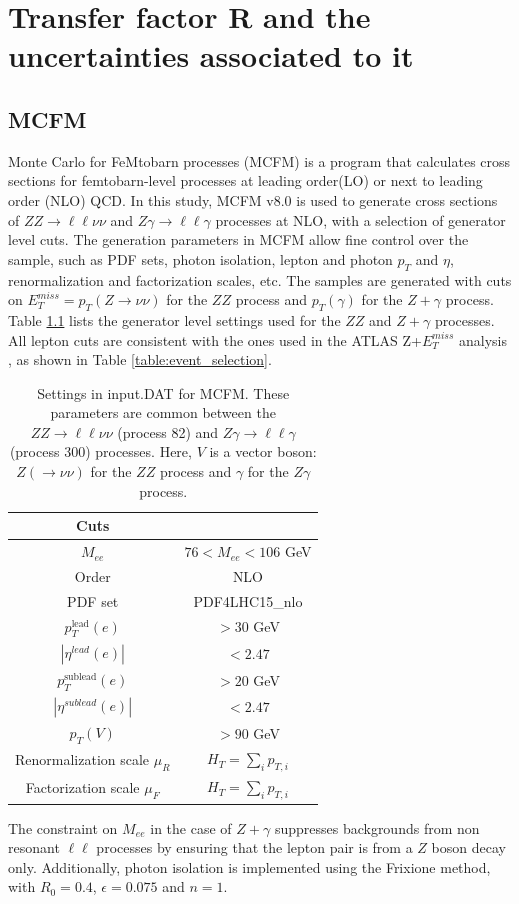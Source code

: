 \documentclass[12pt,a4paper,openright,twoside]{report}
\newcommand{\ZZ}{$ZZ\to \ell\ell\nu\nu$ }
\newcommand{\Zg}{$Z\gamma\to \ell\ell\gamma$ }
\begin{document}
\chapter{Transfer factor R and the uncertainties associated to it}\label{ch:Results}

\section{MCFM}\label{sec:MCFM}
Monte Carlo for FeMtobarn processes (MCFM) is a program that calculates cross sections for femtobarn-level processes at leading order(LO) or next to leading order (NLO) QCD. In this study, MCFM v8.0 \cite{MCFM1, MCFM2, MCFM3, MCFM} is used to generate cross sections of \ZZ and \Zg processes at NLO, with a selection of generator level cuts. The generation parameters in MCFM allow fine control over the sample, such as PDF sets, photon isolation, lepton and photon $p_T$ and $\eta$, renormalization and factorization scales, etc. The samples are generated with cuts on $E_T^{miss} = p_T(Z\to \nu\nu)$ for the $ZZ$ process and $p_T(\gamma)$ for the $Z+\gamma$ process. Table \ref{table:default} lists the generator level settings used for the $ZZ$ and $Z+\gamma$ processes. All lepton cuts are consistent with the ones used in the ATLAS Z+$E_T^{miss}$ analysis \cite{ZH_ATLAS}, as shown in Table \ref{table:event_selection}.

{\renewcommand{\arraystretch}{1.5}
\begin{table}[H]
\centering
	\begin{tabular}{c c}
	\hline
	\hline
	\textbf{Cuts} &\\
	\hline
	$M_{ee}$ & $76 < M_{ee} < 106$ GeV\\
	\hline
	Order & NLO \\
	\hline
	PDF set & PDF4LHC15\_nlo\\
	\hline
	$p_T^{\text{lead}}(e)$ & $> 30$ GeV \\
	\hline
	$|\eta^{lead}(e)|$ & $< 2.47$\\
	\hline
	$p_T^{\text{sublead}}(e)$ & $> 20$ GeV\\
	\hline
	$|\eta^{sublead}(e)|$ & $< 2.47$\\
	\hline
	$p_T(V)$\footnotemark & $> 90$ GeV\\
	\hline
	Renormalization scale $\mu_R$& $H_T = \sum_{i}p_{T,i}$\\
	\hline
	Factorization scale $\mu_F$& $H_T = \sum_{i}p_{T,i}$\\
	\hline
	\hline
	\end{tabular}
	\caption{Settings in input.DAT for MCFM. These parameters are common between the \ZZ (process 82) and \Zg (process 300) processes. Here, $V$ is a vector boson: $Z(\to\nu\nu)$ for the $ZZ$ process and $\gamma$ for the $Z\gamma$ process.}
	\label{table:default}
\end{table}
}
The constraint on $M_{ee}$ in the case of $Z+\gamma$ suppresses backgrounds from non resonant $\ell\ell$ processes by ensuring that the lepton pair is from a $Z$ boson decay only. Additionally, photon isolation is implemented using the Frixione \cite{frixione} method, with $R_0=0.4$, $\epsilon=0.075$ and $n=1$.
\end{document}
